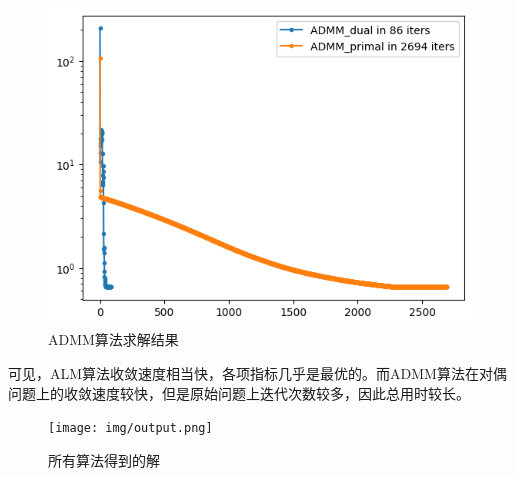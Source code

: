 \documentclass[journal, a4paper]{IEEEtran}
\begin{document}
\begin{figure}[htbp]
    \centering
    \includegraphics[width=0.8\columnwidth]{img/ADMM.png}
    {\centering \small \caption{ADMM算法求解结果\label{fig:ADMM}}}
\end{figure}

可见，ALM算法收敛速度相当快，各项指标几乎是最优的。而ADMM算法在对偶问题上的收敛速度较快，但是原始问题上迭代次数较多，因此总用时较长。

\begin{figure}[htbp]
    \centering
    \texttt{[image: img/output.png]}
    {\centering \small \caption{所有算法得到的解\label{fig:output}}}
\end{figure}





\end{document}
